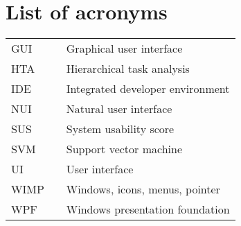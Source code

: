 \chapter*{List of acronyms}

\setlength{\LTleft}{0pt}
\begin{longtable}{lll}
GUI	& \phantom{xxxxxxx} & Graphical user interface\\
HTA	& \phantom{xxxxxxx} & Hierarchical task analysis\\
IDE & \phantom{xxxxxxx} & Integrated developer environment\\
NUI & \phantom{xxxxxxx} & Natural user interface\\
SUS & \phantom{xxxxxxx} & System usability score\\
SVM	& \phantom{xxxxxxx} & Support vector machine\\
UI  & \phantom{xxxxxxx} & User interface\\
WIMP & \phantom{xxxxxxx} & Windows, icons, menus, pointer\\
WPF & \phantom{xxxxxxx} & Windows presentation foundation
\end{longtable}
